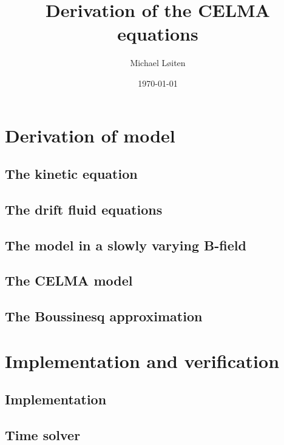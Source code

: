 \documentclass[12pt,a4paper,oneside,openright]{report} %
\title{\vspace{-8ex}Derivation of the CELMA equations\vspace{-1ex}}
\author{Michael L{\o}iten}
\date{\vspace{-2ex}\today}
\begin{document}
\maketitle
%
\part{Derivation of model}
\chapter{The kinetic equation}

%
\chapter{The drift fluid equations}
\label{chap:drift-order}


\chapter{The model in a slowly varying B-field}


\chapter{The CELMA model}
\label{chap:CELMA}






\chapter{The Boussinesq approximation}


\part{Implementation and verification}
\chapter{Implementation}

\chapter{Time solver}

\end{document}
